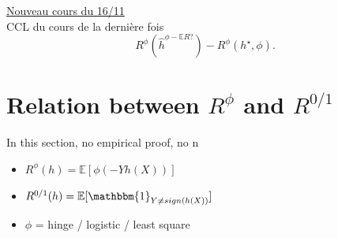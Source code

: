 \underline{Nouveau cours du 16/11} \\

CCL du cours de la dernière fois 
\[
    R^\phi (\hat{h} ^{ \phi - \mathbb{E}R?}) - R^\phi (h ^\star , \phi )
.\]

\section{Relation between $ R^\phi  $ and $ R^{0/1} $  }
In this section, no empirical proof, no n
\begin{itemize}
    \item $ R^\phi(h) = \mathbb{E}[\phi (- Y h(X))]  $ 
    \item $ R^{0/1}(h) = \mathbb{E}[ \mathbbm{1}_{Y \neq sign(h(X))} ] $ 
    \item $ \phi  $ = hinge / logistic / least square
\end{itemize}

